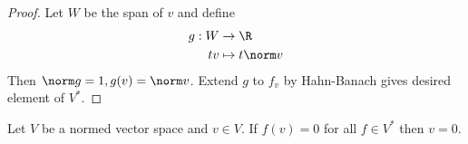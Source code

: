 \documentclass[a4paper]{article}
\begin{document}
\begin{proof}
  Let \(W\) be the span of \(v\) and define
  \begin{align*}
    g: W &\to \R \\
    tv &\mapsto t \norm v
  \end{align*}
  Then \(\norm g = 1, g(v) = \norm v\). Extend \(g\) to \(f_v\) by Hahn-Banach gives desired element of \(V^*\).
\end{proof}

\begin{corollary}
  Let \(V\) be a normed vector space and \(v \in V\). If \(f(v) = 0\) for all \(f \in V^*\) then \(v = 0\).
\end{corollary}

\printindex
\end{document}
